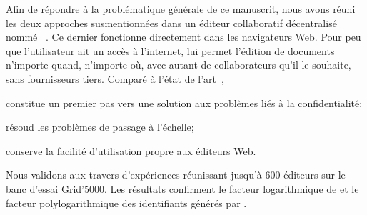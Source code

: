Afin de répondre à la problématique générale de ce manuscrit, nous avons réuni
les deux approches susmentionnées dans un éditeur collaboratif décentralisé
nommé \CRATE~\cite{nedelec2016crate}. Ce dernier fonctionne directement dans les
navigateurs Web. Pour peu que l'utilisateur ait un accès à l'internet, \CRATE
lui permet l'édition de documents n'importe quand, n'importe où, avec autant de
collaborateurs qu'il le souhaite, sans fournisseurs tiers. Comparé à l'état de
l'art~\cite{etherpad, googledocs, hivejs, lautamaki2012cored,
  nicolaescu2015yjs},
\begin{inparaenum}[(i)]
\item \CRATE constitue un premier pas vers une solution aux problèmes liés à la
  confidentialité;
\item \CRATE résoud les problèmes de passage à l'échelle;
\item \CRATE conserve la facilité d'utilisation propre aux éditeurs Web.
\end {inparaenum}
Nous validons \CRATE aux travers d'expériences réunissant jusqu'à 600 éditeurs
sur le banc d'essai Grid'5000. Les résultats confirment le facteur logarithmique
de \SPRAY et le facteur polylogarithmique des identifiants générés par \LSEQ.



